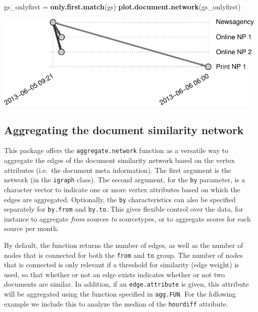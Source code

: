 \documentclass[]{article}
\newenvironment{Shaded}{\begin{snugshade}}{\end{snugshade}}
\newcommand{\KeywordTok}[1]{\textcolor[rgb]{0.13,0.29,0.53}{\textbf{{#1}}}}
\newcommand{\StringTok}[1]{\textcolor[rgb]{0.31,0.60,0.02}{{#1}}}
\newcommand{\NormalTok}[1]{{#1}}
\begin{document}
\begin{Shaded}
\begin{Highlighting}[]
\NormalTok{gs_onlyfirst =}\StringTok{ }\KeywordTok{only.first.match}\NormalTok{(gs)}
\KeywordTok{plot.document.network}\NormalTok{(gs_onlyfirst)}
\end{Highlighting}
\end{Shaded}

\includegraphics{vignette_files/figure-latex/unnamed-chunk-17-1.pdf}

\subsection{Aggregating the document similarity
network}\label{aggregating-the-document-similarity-network}

This package offers the \texttt{aggregate.network} function as a
versatile way to aggregate the edges of the document similarity network
based on the vertex attributes (i.e.~the document meta information). The
first argument is the network (in the \texttt{igraph} class). The second
argument, for the \texttt{by} parameter, is a character vector to
indicate one or more vertex attributes based on which the edges are
aggregated. Optionally, the \texttt{by} characteristics can also be
specified separately for \texttt{by.from} and \texttt{by.to}. This gives
flexible control over the data, for instance to aggregate \emph{from}
sources \emph{to} sourcetypes, or to aggregate scores for each source
per month.

By default, the function returns the number of edges, as well as the
number of nodes that is connected for both the \texttt{from} and
\texttt{to} group. The number of nodes that is connected is only
relevant if a threshold for similarity (edge weight) is used, so that
whether or not an edge exists indicates whether or not two documents are
similar. In addition, if an \texttt{edge.attribute} is given, this
attribute will be aggregated using the function specified in
\texttt{agg.FUN}. For the following example we include this to analyze
the median of the \texttt{hourdiff} attribute.
\end{document}
